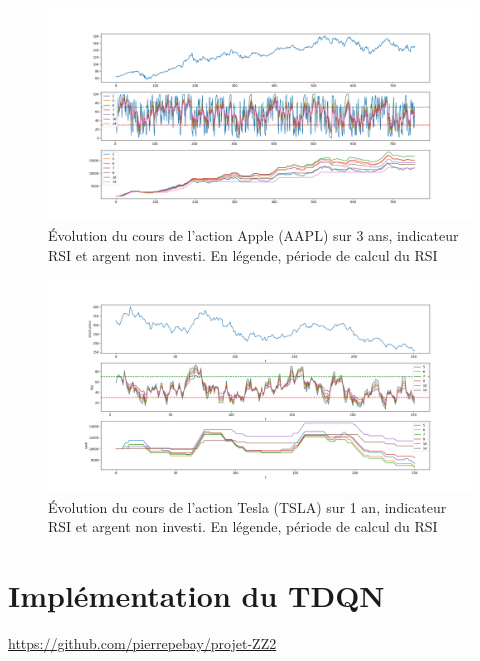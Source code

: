 \documentclass[twocolumn]{article}
\begin{document}
\onecolumn
\begin{figure}[!h]
  \includegraphics[width=\linewidth]{AAPL_3y.png}
  \caption{Évolution du cours de l'action Apple (AAPL) sur 3 ans, indicateur RSI et argent non investi. En légende, période de calcul du RSI}
  \label{fig:aaplrsi}
\end{figure}

\begin{figure}[!h]
  \includegraphics[width=\linewidth]{TSLA_1y.png}
  \caption{Évolution du cours de l'action Tesla (TSLA) sur 1 an, indicateur RSI et argent non investi. En légende, période de calcul du RSI}
  \label{fig:tslarsi}
\end{figure}

\twocolumn

\section{Implémentation du TDQN}

\href{https://github.com/pierrepebay/projet-ZZ2}{https://github.com/pierrepebay/projet-ZZ2}

\nocite{*}



\newpage
\end{document}
